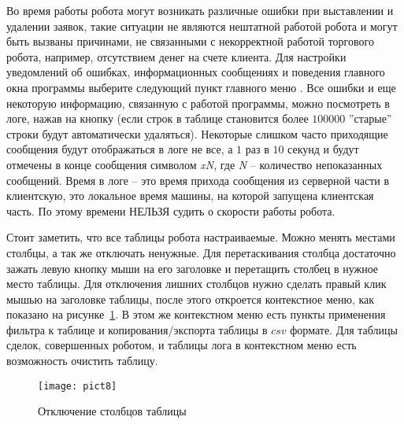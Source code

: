 
Во время работы робота могут возникать различные ошибки при выставлении и удалении заявок, такие ситуации не являются нештатной работой робота и могут быть вызваны причинами,
не связанными с некорректной работой торгового робота, например, отсутствием денег на счете клиента. Для настройки уведомлений об ошибках, информационных сообщениях и поведения
главного окна программы выберите следующий  пункт главного меню .
Все ошибки и еще некоторую информацию, связанную с работой программы, можно посмотреть в логе,
нажав на кнопку  (если строк в таблице становится более $100000$ ''старые'' строки будут автоматически удаляться).
Некоторые слишком часто приходящие сообщения будут отображаться в логе не все, а $1$ раз в $10$ секунд и будут отмечены в конце сообщения символом \textit{xN}, где \textit{N} -- количество непоказанных сообщений.
Время в логе -- это время прихода сообщения из серверной части в клиентскую, это локальное время машины, на
которой запущена клиентская часть. По этому времени НЕЛЬЗЯ судить о скорости работы робота.

Стоит заметить, что все таблицы робота настраиваемые. Можно менять местами столбцы, а так же отключать ненужные. Для перетаскивания столбца достаточно зажать левую
кнопку мыши на его заголовке и перетащить столбец в нужное место таблицы. Для отключения лишних столбцов нужно сделать правый клик мышью на заголовке таблицы, после этого
откроется контекстное меню, как показано на рисунке~\ref{fig:check}. В этом же контекстном меню есть пункты применения фильтра к таблице и копирования/экспорта таблицы в $csv$ формате.
Для таблицы сделок, совершенных роботом, и таблицы лога в контекстном меню есть возможность очистить таблицу.
\begin{figure}[h!]
\centering
\texttt{[image: pict8]}
\caption{Отключение столбцов таблицы}
\label{fig:check}
\end{figure}


